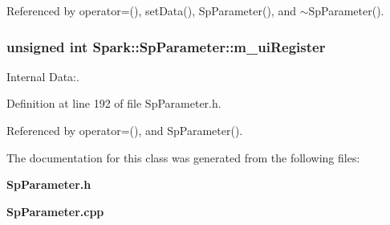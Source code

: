 Referenced by operator=(), set\-Data(), Sp\-Parameter(), and $\sim$Sp\-Parameter().
\subsubsection{\setlength{\rightskip}{0pt plus 5cm}unsigned int {\bf Spark::Sp\-Parameter::m\_\-ui\-Register}\hspace{0.3cm}{\tt  [protected]}}\label{classSpark_1_1SpParameter_p0}


Internal Data:. 

Definition at line 192 of file Sp\-Parameter.h.

Referenced by operator=(), and Sp\-Parameter().

The documentation for this class was generated from the following files:\begin{CompactItemize}
\item 
{\bf Sp\-Parameter.h}\item 
{\bf Sp\-Parameter.cpp}\end{CompactItemize}
